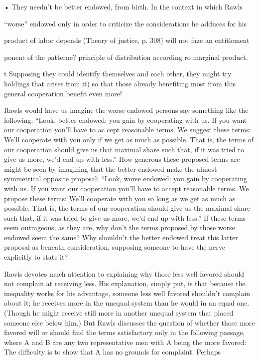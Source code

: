 \documentclass[11pt,openany]{book}
\begin{document}
• They needn't be better endowed, from birth. In the context in which Rawls 

``worse'' endowed only in order to criticize the considerations he adduces for his 

product of labor depends (Theory of justice, p. 308) will not faze an entitlement 

ponent of the patterne? principle of distribution according ro marginal product. 

t Supposing they could identify themselves and each other, they might try holdings that arises from it) so that those already benefiting most from this general cooperation benefit even more! 

Rawls would have us imagine the worse-endowed persons say something like the following: ``Look, better endowed: you gain by cooperating with us. If you want our cooperation you'll have to ac cept reasonable terms. We suggest these terms: We'll cooperate with you only if we get as much as possible. That is, the terms of our cooperation should give us that maximal share such that, if it was tried to give us more, we'd end up with less.'' How generous these proposed terms are might be seen by imagining that the better endowed make the almost symmetrical opposite proposal: ``Look, worse endowed: you gain by cooperating with us. If you want our cooperation you'll have to accept reasonable terms. We propose these terms: We'll cooperate with you so long as we get as much as possible. That is, the terms of our cooperation should give us the maximal share such that, if it was tried to give us more, we'd end up with less.'' If these terms seem outrageous, as they are, why don't the terms proposed by those worse endowed seem the same? Why shouldn't the better endowed treat this latter proposal as beneath consideration, supposing someone to have the nerve explicitly to state it? 

Rawls devotes much attention to explaining why those less well favored should not complain at receiving less. His explanation, simply put, is that because the inequality works for his advantage, someone less well favored shouldn't complain about it; he receives more in the unequal system than he would in an equal one. (Though he might receive still more in another unequal system that placed someone else below him.) But Rawls discusses the question of whether those more favored will or should find the terms satisfactory only in the following passage, where A and B are any two representative men with A being the more favored: The difficulty is to show that A has no grounds for complaint. Perhaps 
\end{document}
